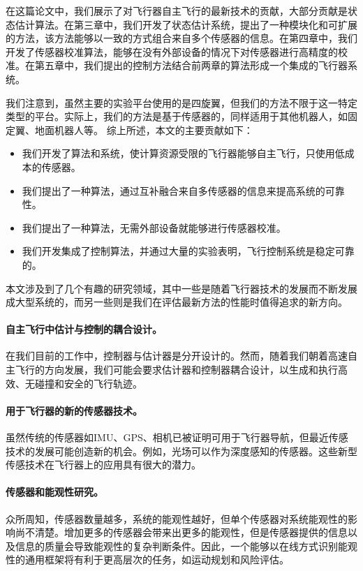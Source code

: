 \documentclass[
  type=master
]{gdutthesis}
\begin{document}
\gdutbackmatter
{}
在这篇论文中，我们展示了对飞行器自主飞行的最新技术的贡献，大部分贡献是状态估计算法。在第三章中，我们开发了状态估计系统，提出了一种模块化和可扩展的方法，该方法能够以一致的方式组合来自多个传感器的信息。在第四章中，我们开发了传感器校准算法，能够在没有外部设备的情况下对传感器进行高精度的校准。在第五章中，我们提出的控制方法结合前两章的算法形成一个集成的飞行器系统。

我们注意到，虽然主要的实验平台使用的是四旋翼，但我们的方法不限于这一特定类型的平台。实际上，我们的方法是基于传感器的，同样适用于其他机器人，如固定翼、地面机器人等。
综上所述，本文的主要贡献如下：
\begin{itemize}
	\item 我们开发了算法和系统，使计算资源受限的飞行器能够自主飞行，只使用低成本的传感器。
	\item 我们提出了一种算法，通过互补融合来自多传感器的信息来提高系统的可靠性。
	\item 我们提出了一种算法，无需外部设备就能够进行传感器校准。
	\item 我们开发集成了控制算法，并通过大量的实验表明，飞行控制系统是稳定可靠的。
\end{itemize}

本文涉及到了几个有趣的研究领域，其中一些是随着飞行器技术的发展而不断发展成大型系统的，而另一些则是我们在评估最新方法的性能时值得追求的新方向。
\paragraph{自主飞行中估计与控制的耦合设计。}
在我们目前的工作中，控制器与估计器是分开设计的。然而，随着我们朝着高速自主飞行的方向发展，我们可能会要求估计器和控制器耦合设计，以生成和执行高效、无碰撞和安全的飞行轨迹。
\paragraph{用于飞行器的新的传感器技术。}
虽然传统的传感器如IMU、GPS、相机已被证明可用于飞行器导航，但最近传感技术的发展可能创造新的机会。例如，光场可以作为深度感知的传感器。这些新型传感技术在飞行器上的应用具有很大的潜力。
\paragraph{传感器和能观性研究。}
众所周知，传感器数量越多，系统的能观性越好，但单个传感器对系统能观性的影响尚不清楚。增加更多的传感器会带来出更多的能观性，但是传感器提供的信息以及信息的质量会导致能观性的复杂判断条件。因此，一个能够以在线方式识别能观性的通用框架将有利于更高层次的任务，如运动规划和风险评估。
\end{document}
